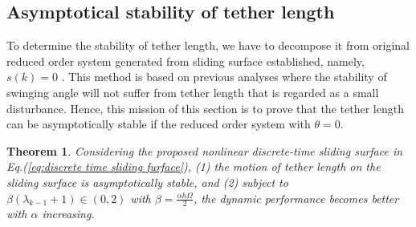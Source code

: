 \documentclass[10pt,final,journal]{IEEEtran}
\newtheorem{mythm}{Theorem}
\begin{document}
	\subsection{Asymptotical stability of tether length}\label{subsec:astl}
	To determine the stability of tether length, we have to decompose it from original reduced order  system generated from sliding surface established, namely, $s(k)=0$ . This method is based on previous analyses where the stability of swinging angle will not suffer from tether length that is regarded as a small disturbance. Hence, this mission of this section is to prove that the tether length can be asymptotically stable if the reduced order  system with $\theta = 0$. 
	\begin{mythm}
		Considering the proposed nonlinear discrete-time sliding surface in Eq.(\ref{eq:discrete time sliding furface}),  (1) the motion of tether length on the sliding surface is asymptotically stable, and (2) subject to $\beta(\lambda_{k-1}+1)\in(0,2)$ with $\beta = \frac{\alpha h\Omega}{2}$, the dynamic performance becomes better with $\alpha$ increasing.  
	\end{mythm}
\end{document}
